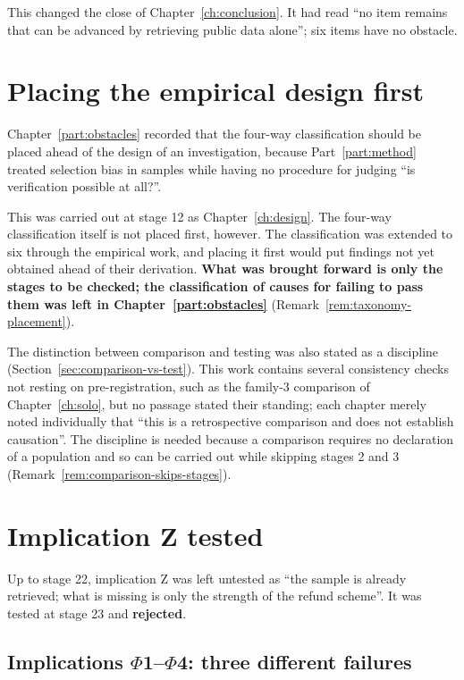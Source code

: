 This changed the close of Chapter~\ref{ch:conclusion}. It had read ``no item remains that can be
advanced by retrieving public data alone''; six items have no obstacle.

\section{Placing the empirical design first}

Chapter~\ref{part:obstacles} recorded that the four-way classification should be placed ahead of
the design of an investigation, because Part~\ref{part:method} treated selection bias in samples
while having no procedure for judging ``is verification possible at all?''.

This was carried out at stage 12 as Chapter~\ref{ch:design}. The four-way classification itself is
not placed first, however. The classification was extended to six through the empirical work, and
placing it first would put findings not yet obtained ahead of their derivation. \textbf{What was
brought forward is only the stages to be checked; the classification of causes for failing to pass
them was left in Chapter~\ref{part:obstacles}} (Remark~\ref{rem:taxonomy-placement}).

The distinction between comparison and testing was also stated as a discipline
(Section~\ref{sec:comparison-vs-test}). This work contains several consistency checks not resting
on pre-registration, such as the family-3 comparison of Chapter~\ref{ch:solo}, but no passage
stated their standing; each chapter merely noted individually that ``this is a retrospective
comparison and does not establish causation''. The discipline is needed because a comparison
requires no declaration of a population and so can be carried out while skipping stages 2 and 3
(Remark~\ref{rem:comparison-skips-stages}).

\section{Implication Z tested}

Up to stage 22, implication Z was left untested as ``the sample is already retrieved; what is
missing is only the strength of the refund scheme''. It was tested at stage 23 and
\textbf{rejected}.

\subsection{Implications \texorpdfstring{$\Phi$}{Phi}1--\texorpdfstring{$\Phi$}{Phi}4: three different failures}

